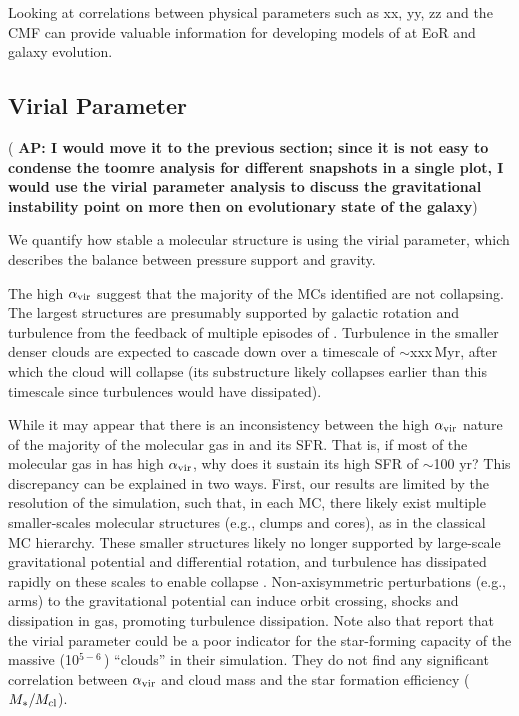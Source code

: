 \documentclass[iop]{emulateapj} %
\newcommand{\AP}[1]{({\bf \color{apcolor} AP: #1})}
\begin{document}
Looking at correlations between physical parameters such as xx, yy, zz and the CMF
can provide valuable information for developing models of \SF at EoR and
galaxy evolution.


\subsection{Virial Parameter}

\AP{I would move it to the previous section; since it is not easy to condense the toomre analysis for different snapshots in a single plot, I would use the virial parameter analysis to discuss the gravitational instability point on more then on evolutionary state of the galaxy}

We quantify how stable a molecular structure is using the virial parameter, which
describes the balance between pressure support and gravity.

The high $\alpha_{\rm vir}$ suggest that the majority of the MCs identified are not collapsing.
The largest structures are presumably supported by galactic rotation and turbulence from the feedback of
multiple episodes of \SF.
Turbulence in the smaller denser clouds are expected to cascade down over a timescale of $\sim$xxx\,Myr, after which the cloud will collapse
(its substructure likely collapses earlier than this timescale since turbulences would have dissipated).

While it may appear that there is an inconsistency between the high $\alpha_{\rm vir}$
nature of the majority of the molecular gas in \flower and its SFR.
That is, if most of the molecular gas in \flower has high $\alpha_{\rm vir}$, why does it sustain its high SFR of $\sim$100\,\Msun\,yr\pmOne?
This discrepancy can be explained in two ways.
First, our results are limited by the resolution of the simulation, such that, in each MC, there
likely exist multiple smaller-scales molecular structures (e.g., clumps and cores),
as in the classical MC hierarchy. These smaller structures likely no longer supported by large-scale gravitational potential and differential rotation,
and turbulence has dissipated rapidly on these scales to enable collapse \citep{Clark04a}.
Non-axisymmetric perturbations (e.g., arms) to the gravitational potential
can induce orbit crossing, shocks and dissipation in gas, promoting turbulence dissipation.
Note also that \citet{Pettitt18a} report that the virial parameter could be a poor indicator
for the star-forming capacity of the massive (10$^{5-6}$\,\Msun) ``clouds'' in their simulation. They
do not find any significant correlation between $\alpha_{\rm vir}$ and cloud mass
and the star formation efficiency ($M_*/M_{\rm cl}$).
\end{document}
